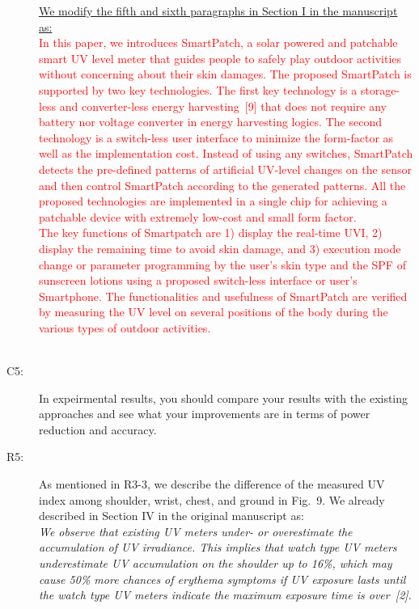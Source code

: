 \documentclass[onecolumn]{IEEEconf}
\begin{document}
\begin{description}
\underline{We modify the fifth and sixth paragraphs in Section I in the manuscript as:}\\
\textcolor{red}{In this paper, we introduces SmartPatch, a solar powered  and patchable smart UV level meter that guides people to safely play outdoor activities without concerning about their skin damages. The proposed SmartPatch is supported by two key technologies. The first key technology is a storage-less and converter-less energy harvesting~[9] that does not require any battery nor voltage converter in energy harvesting logics. The second technology is a switch-less user interface to minimize the form-factor as well as the implementation cost. Instead of using any switches, SmartPatch detects the pre-defined patterns of artificial UV-level changes on the sensor and then control SmartPatch according to the generated patterns. All the proposed technologies are implemented in a single chip for achieving a patchable device with extremely low-cost and small form factor.\\
% 
The key functions of Smartpatch are 1) display the real-time UVI, 2) display the remaining time to avoid skin damage, and 3) execution mode change or parameter programming by the user's skin type and the SPF of sunscreen lotions using a proposed switch-less interface or user's Smartphone. The functionalities and usefulness of SmartPatch are verified by measuring the UV level on several positions of the body during the various types of outdoor activities.}\\

~\\

\item [C5: ] In expeirmental results, you should compare your results with the existing approaches and see what your improvements are in terms of power reduction and accuracy.
\item [R5: ] As mentioned in R3-3, we describe the difference of the measured UV index among shoulder, wrist, chest, and ground in Fig.~9. We already described in Section IV in the original manuscript as:\\

\textit{We observe that existing UV meters under- or overestimate the accumulation of UV irradiance. This implies that watch type UV meters underestimate UV accumulation on the shoulder up to 16\%, which may cause 50\% more chances of erythema symptoms if UV exposure lasts until the watch type UV meters indicate the maximum exposure time is over~[2].}\\


\end{description}
\end{document}
